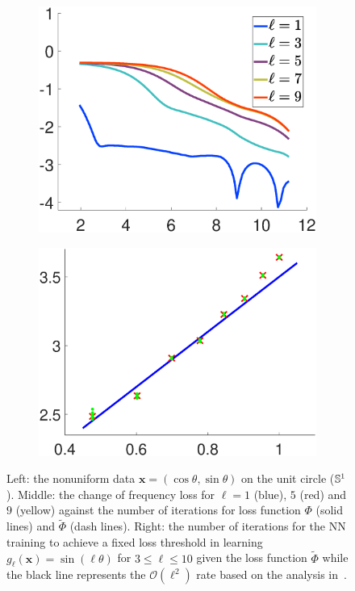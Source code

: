 \documentclass{article} %
\begin{document}
\begin{figure}
{\begin{subfigure}{0.3\textwidth}
\includegraphics[width = \textwidth]{figures-1D/weighted_train.eps}
\label{fig:weighted_train-1D}
\end{subfigure}
\hfill
\begin{subfigure}{0.3\textwidth}
\includegraphics[width = \textwidth]{figures-1D/iterations.eps}
\end{subfigure}
}
\caption{Left: the nonuniform data $\mathbf{x} = (\cos\theta ,\sin \theta)$ on the unit circle (${\mathbb{S}}^1$). Middle: the change of frequency loss for $\ell = 1$ (blue), $5$ (red) and $9$ (yellow) against the number of iterations for loss function $\Phi$ (solid lines) and $\widetilde \Phi$ (dash lines). Right: the number of iterations for the NN training to achieve a fixed loss threshold in learning $g_\ell(\mathbf x) = \sin(\ell\theta)$ for $3\leq \ell\leq 10$ given the loss function $\widetilde \Phi$ while the black line represents the $\mathcal O(\ell^2)$ rate based on the analysis in~\citep{basri}.\label{fig:weighted-1D}}
\end{figure}
\end{document}
